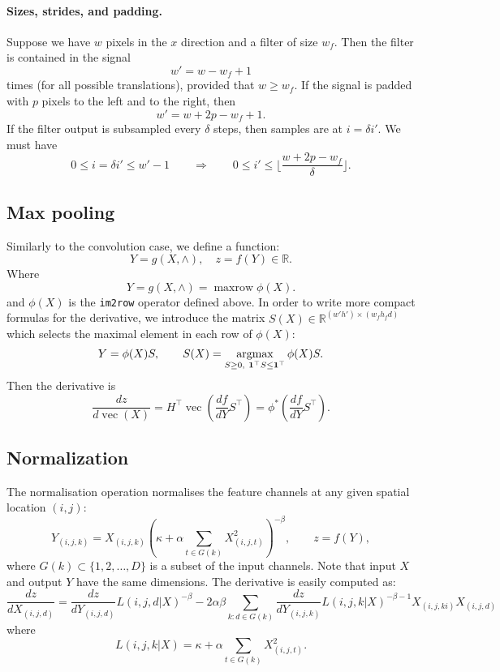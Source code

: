 \documentclass[12pt]{article}
\newcommand{\real}{\mathbb{R}}
\newcommand{\vv}{\operatorname{vec}}
\begin{document}
\paragraph{Sizes, strides, and padding.}
Suppose we have $w$ pixels in the $x$ direction and a filter of size $w_f$. Then the filter is contained in the signal
\[
  w' = w - w_f + 1
\]
times (for all possible translations), provided that $w\geq w_f$. If the signal is padded with $p$ pixels to the left and to the right, then
\[
  w' = w + 2p - w_f + 1.
\]
If the filter output is subsampled every $\delta$ steps, then samples are at $i = \delta i'$. We must have
\[
0\leq i = \delta i' \leq w'-1
\qquad
\Rightarrow
\qquad
0 \leq i' \leq \lfloor \frac{w + 2p - w_f}{\delta} \rfloor.
\]


\subsection{Max pooling}\label{s:pooling}

Similarly to the convolution case, we define a function:
\[
 Y = g(X,\wedge), \quad z = f(Y) \in \real.
\]
Where
\[
\boxed{Y = g(X,\wedge) = \operatorname{maxrow}\phi(X).}
\]
and $\phi(X)$ is the {\tt im2row} operator defined above. In order to write more compact formulas for the derivative, we introduce the matrix $S(X) \in \real^{(w'h')
\times(w_fh_fd)}$ which selects the maximal element in each row of $\phi(X)$:
\[
  Y = \phi(X)S,
  \qquad
   S(X) = \operatornamewithlimits{argmax}_{S \geq 0,\ \mathbf{1}^\top S \leq \mathbf{1}^\top} \phi(X) S.
\]
Then the derivative is
\[
\boxed{
\frac{d z}{d \vv(X)}
=
H^\top
\vv\left(
\frac{d f}{d Y}S^\top
\right)
=
\phi^*\left(
\frac{d f}{d Y}S^\top
\right).
}
\]

\subsection{Normalization}\label{s:normalization}

The normalisation operation normalises the feature channels at any given spatial location $(i,j)$:
\[
 Y_{(i,j,k)} = X_{(i,j,k)} \left( \kappa + \alpha \sum_{t\in G(k)} X_{(i,j,t)}^2 \right)^{-\beta},
 \qquad
 z = f(Y),
\]
where $G(k) \subset \{1, 2, \dots, D\}$ is a subset of the input channels. Note that input $X$ and output $Y$ have the same dimensions. The derivative is easily computed as:
\[
\frac{dz}{d X_{(i,j,d)}}
=
\frac{dz}{d Y_{(i,j,d)}}
L(i,j,d|X)^{-\beta}
-2\alpha\beta
\sum_{k:d\in G(k)}
\frac{dz}{d Y_{(i,j,k)}}
L(i,j,k|X)^{-\beta-1} X_{(i,j,ki)} X_{(i,j,d)}
\]
where
\[
 L(i,j,k|X) = \kappa + \alpha \sum_{t\in G(k)} X_{(i,j,t)}^2.
\]
\end{document}
